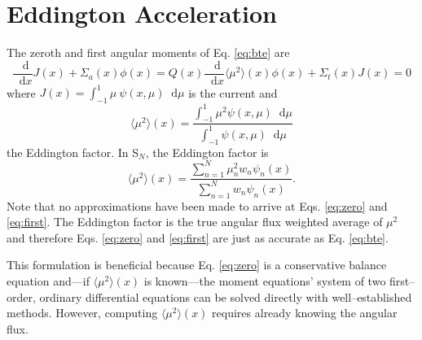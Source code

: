 \documentclass{anstrans}
\newcommand{\SN}{S$_N$\xspace}
\newcommand{\ud}{\mathop{}\!\mathrm{d}} %
\newcommand{\dderiv}[2]{\frac{\ud #1}{\ud #2}}
\newcommand{\edd}{\langle \mu^2 \rangle}
\begin{document}
\section{Eddington Acceleration}
	The zeroth and first angular moments of Eq. \ref{eq:bte} are 
		\begin{subequations} 
		\begin{equation} \label{eq:zero}
			\dderiv{}{x} J(x) + \Sigma_a(x) \phi(x) = Q(x) 
		\end{equation} 
		\begin{equation} \label{eq:first}
			\frac{\ud}{\ud x} \edd(x) \phi(x) + \Sigma_t(x) J(x) = 0  
		\end{equation}
		\end{subequations}
	where $J(x) = \int_{-1}^{1} \mu \ \psi(x, \mu) \ud \mu$ is the current and 
		\begin{equation} \label{eq:eddington} 
			\edd(x) = \frac{\int_{-1}^1 \mu^2 \psi(x, \mu) \ud \mu}{\int_{-1}^1 \psi(x, \mu) \ud \mu}
		\end{equation}
	the Eddington factor. In \SN, the Eddington factor is 
		\begin{equation} \label{eq:edd_sn}
			\edd(x) = \frac{\sum_{n=1}^N \mu_n^2 w_n\psi_n(x)}{\sum_{n=1}^N w_n \psi_n(x)}.
		\end{equation}
	Note that no approximations have been made to arrive at Eqs. \ref{eq:zero} and \ref{eq:first}. The Eddington factor is the true angular flux weighted average of $\mu^2$ and therefore Eqs. \ref{eq:zero} and \ref{eq:first} are just as accurate as Eq. \ref{eq:bte}. 

	This formulation is beneficial because Eq. \ref{eq:zero} is a conservative balance equation and---if $\edd(x)$ is known---the moment equations' system of two first--order, ordinary differential equations can be solved directly with well--established methods. However, computing $\edd(x)$ requires already knowing the angular flux. 
\end{document}
